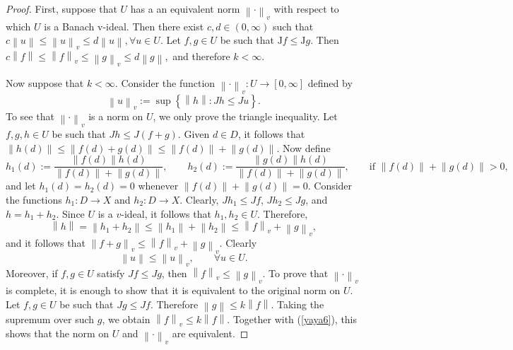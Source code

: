 \documentclass[10pt,a4paper]{amsart}
\newcommand{\J}{\mathrm{J}}
\providecommand{\llave}[1]{\left\lbrace #1\right\rbrace }
\providecommand{\norm}[1]{\left\lVert#1\right\rVert}
\providecommand{\pare}[1]{\left( #1\right) }
\newcommand{\tien}{\rightarrow}
\begin{document}
 \begin{proof}
First, suppose that $U$ has a an equivalent norm   $\norm{\cdot}_{v}$ with respect to which $U$ is a Banach v-ideal. Then there exist $c,d\in(0,\infty)$ such that
$
c\norm{u}\leq \norm{u}_{v}\leq d\norm{u},  \forall u\in U.
$
Let $f,g\in U$ be such that $\J f\leq \J g$. Then
$
c\norm{f}\leq \norm{f}_{v}\leq \norm{g}_{v}\leq d\norm{g},
$
and therefore
$
k <\infty.
$ 

Now suppose that $k<\infty$. Consider the function $\norm{\cdot}_{v}:U\tien[0,\infty]$ defined by
\begin{equation}
	\norm{u}_{v}:=\sup\llave{\norm{h}:Jh\leq Ju}.
\end{equation}
To see that $\norm{\cdot}_{v}$ is a norm on $U$, we only prove the triangle inequality. Let $f,g,h\in U$ be such that $Jh\leq J\pare{f+g}$.
Given $d\in D$, it follows that
$
\norm{h\pare{d}}
\leq
\norm{f\pare{d}+g\pare{d}}
\leq
\norm{f\pare{d}}+\norm{g\pare{d}}.
$
Now define
\begin{equation}
	h_{1}\pare{d}:=
	\frac{\norm{f\pare{d}}h\pare{d}}{\norm{f\pare{d}}+\norm{g\pare{d}}},
	\qquad
	h_{2}\pare{d}:=
	\frac{\norm{g\pare{d}}h\pare{d}}{\norm{f\pare{d}}+\norm{g\pare{d}}},
	\qquad
	\text{if }\norm{f\pare{d}}+\norm{g\pare{d}}>0,
\end{equation}
and let $h_{1}(d)=h_{2}(d)=0$ whenever
$
\norm{f\pare{d}}+\norm{g\pare{d}}=0.
$
Consider the functions $h_{1}:D\tien X$ and $h_{2}:D\tien X$. Clearly, $Jh_{1}\leq Jf$, $Jh_{2}\leq Jg$, and $h=h_{1}+h_{2}$. Since $U$ is a $v$-ideal, it follows that $h_{1}, h_{2}\in U$. Therefore,
\begin{equation}
	\norm{h}=\norm{h_{1}+h_{2}}\leq \norm{h_{1}}+\norm{h_{2}}\leq \norm{f}_{v}+\norm{g}_{v},
\end{equation}
and it follows that 
$
\norm{f+g}_{v}\leq \norm{f}_{v}+\norm{g}_{v}.
$
Clearly
\begin{equation}\label{yaya6}
	\norm{u}\leq \norm{u}_{v},\qquad \forall u\in U.
\end{equation}
Moreover, if $f,g\in U$ satisfy $Jf\leq Jg$, then $\norm{f}_{v}\leq \norm{g}_{v}$. To prove that $\norm{\cdot}_{v}$ is complete, it is enough to show that it is equivalent to the original norm on $U$. 
Let $f,g\in U$ be such that $Jg\leq Jf$. Therefore
$
\norm{g}\leq k\norm{f}.
$
Taking the supremum over such  $g$, we obtain
$
\norm{f}_{v}\leq k\norm{f}.
$
Together with (\ref{yaya6}), this shows that the norm on $U$ and $\norm{\cdot}_{v}$ are equivalent.
 \end{proof}
\end{document}
